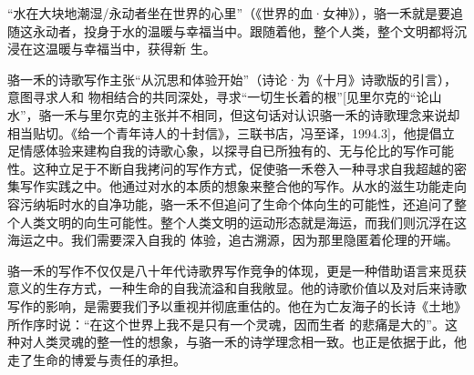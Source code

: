 \documentclass{article}
\begin{document}
“水在大块地潮湿/永动者坐在世界的心里”（《世界的血·女神》），骆一禾就是要追随这永动者，投身于水的温暖与幸福当中。跟随着他，整个人类，整个文明都将沉浸在这温暖与幸福当中，获得新
生。 

骆一禾的诗歌写作主张“从沉思和体验开始”（诗论·为《十月》诗歌版的引言），意图寻求人和
\newpage
物相结合的共同深处，寻求“一切生长着的根”[见里尔克的“论山水”，骆一禾与里尔克的主张并不相同，但这句话对认识骆一禾的诗歌理念来说却相当贴切。《给一个青年诗人的十封信》，三联书店，冯至译，1994.3]，他提倡立足情感体验来建构自我的诗歌心象，以探寻自已所独有的、无与伦比的写作可能性。这种立足于不断自我拷问的写作方式，促使骆一禾卷入一种寻求自我超越的密集写作实践之中。他通过对水的本质的想象来整合他的写作。从水的滋生功能走向容污纳垢时水的自净功能，骆一禾不但追问了生命个体向生的可能性，还追问了整个人类文明的向生可能性。整个人类文明的运动形态就是海运，而我们则沉浮在这海运之中。我们需要深入自我的
体验，追古溯源，因为那里隐匿着伦理的开端。 

骆一禾的写作不仅仅是八十年代诗歌界写作竞争的体现，更是一种借助语言来觅获意义的生存方式，一种生命的自我流溢和自我敞显。他的诗歌价值以及对后来诗歌写作的影响，是需要我们予以重视并彻底重估的。他在为亡友海子的长诗《土地》所作序时说：“在这个世界上我不是只有一个灵魂，因而生者
\newpage
的悲痛是大的”。这种对人类灵魂的整一性的想象，与骆一禾的诗学理念相一致。也正是依据于此，他走了生命的博爱与责任的承担。
\end{document}
